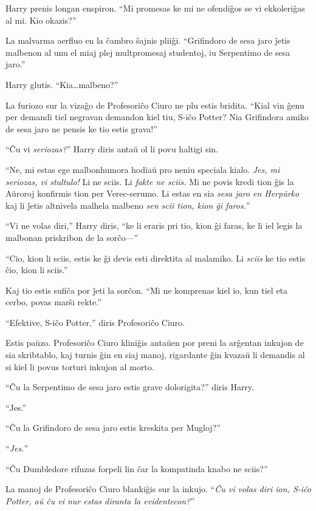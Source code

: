 Harry prenis longan enspiron. ``Mi promesas ke mi ne ofendiĝos se vi
ekkoleriĝas al mi. Kio okazis?''

La malvarma aerfluo en la ĉambro ŝajnis pliiĝi. ``Grifindoro de sesa
jaro ĵetis malbenon al unu el miaj plej multpromesaj studentoj, iu
Serpentimo de sesa jaro.''

Harry glutis. ``Kia\ldots{}malbeno?''

La furiozo sur la vizaĝo de Profesoriĉo Ciuro ne plu estis
bridita. ``Kial vin ĝenu per demandi tiel negravan demandon kiel tiu,
S-iĉo Potter? Nia Grifindora amiko de sesa jaro ne pensis ke tio estis
grava!''

``Ĉu vi \emph{seriozas?}'' Harry diris antaŭ ol li povu haltigi sin.

``Ne, mi estas ege malbonhumora hodiaŭ pro neniu speciala
kialo. \emph{Jes, mi seriozas, vi stultulo!} Li ne sciis. Li
\emph{fakte ne sciis.} Mi ne povis kredi tion ĝis la Aŭroroj konfirmis
tion per Verec-serumo. Li estas en sia \emph{sesa jaro en Herpŭrko}
kaj li ĵetis altnivela malhela malbeno \emph{sen scii tion, kion ĝi
  faros.}''

``Vi ne volas diri,'' Harry diris, ``ke li eraris pri tio, kion ĝi
faras, ke li iel legis la malbonan priskribon de la sorĉo—''

``Cio, kion li sciis, estis ke ĝi devis esti direktita al malamiko. Li
\emph{sciis} ke tio estis ĉio, kion li sciis.''

Kaj tio estis sufiĉa por ĵeti la sorĉon. ``Mi ne komprenas kiel io,
kun tiel eta cerbo, povas marŝi rekte.''

``Efektive, S-iĉo Potter,'' diris Profesoriĉo Ciuro.

Estis paŭzo. Profesoriĉo Ciuro kliniĝis antaŭen por preni la arĝentan
inkujon de sia skribtablo, kaj turnis ĝin en siaj manoj, rigardante
ĝin kvazaŭ li demandis al si kiel li povus torturi inkujon al morto.

``Ĉu la Serpentimo de sesa jaro estis grave dolorigita?'' diris Harry.

``Jes.''

``Ĉu la Grifindoro de sesa jaro estis kreskita per Mugloj?''

``\emph{Jes.}''

``Ĉu Dumbledore rifuzas forpeli lin ĉar la kompatinda knabo ne sciis?''

La manoj de Profesoriĉo Ciuro blankiĝis sur la inkujo. ``\emph{Ĉu vi
  volas diri ion, S-iĉo Potter, aŭ ĉu vi nur estas diranta la
  evidentecon?}''

